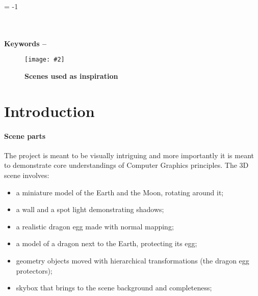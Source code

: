 \documentclass[10pt, a4paper]{article}
\title{\mytitle}
\author{\myauthor\hspace{1em}\\\contact\\Edinburgh Napier University\hspace{0.5em}-\hspace{0.5em}\mymodule}
\date{}
\newcommand{\figuremacro}[5]{
    \begin{figure}[#1]
        \centering
        \texttt{[image: \#2]}
        \caption[#3]{\textbf{#3}#4}
        \label{fig:#2}
    \end{figure}
}
\begin{document}
	
	
	\hyphenchar\font = -1
	
	\maketitle
	\begin{abstract}
		 The aim of this project is to create a realistic 3D scene, rendered in real-time. The project is inspired by the series \textit{Games of Thrones}\cite{dragons} and previous years projects found on the games website\cite{gamesWebsite} of Napier University. A wide variety of graphics techniques were used to create the 3D scene, from multiple lights and light types to shadowing, material shading and transform hierarchy. This report covers how te scene was implemented and what future work is considered.
	\end{abstract}
	\\\\
	\textbf{Keywords -- }{\mykeywords}
	\figuremacro{h}{inspiration}{Scenes used as inspiration}{ }{1.0}	
    
	\section{Introduction}
    \paragraph{Scene parts} The project is meant to be visually intriguing and more importantly it is meant to demonstrate core understandings of Computer Graphics principles. The 3D scene involves:   
    \begin{itemize}
    	\item a miniature model of the Earth and the Moon, rotating around it;
    	\item a wall and a spot light demonstrating shadows;
    	\item a realistic dragon egg made with normal mapping;
    	\item a model of a dragon next to the Earth, protecting its egg;
    	\item geometry objects moved with hierarchical transformations (the dragon egg protectors);
    	\item skybox that brings to the scene background and completeness;
    \end{itemize}
    
    
\end{document}
